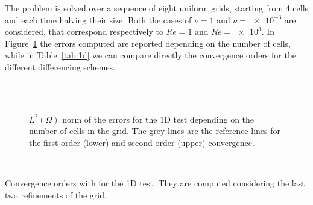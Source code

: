The problem is solved over a sequence of eight uniform grids, starting from 
4 cells and each time halving their size. Both the cases of $\nu=1$ 
and $\nu=\num{e-3}$ are considered, that correspond respectively to $Re=1$ and $Re=\num{e3}$. In Figure~\ref{fig:1d_err} the errors computed are reported 
depending on the number of cells, while in 
Table~\ref{tab:1d} we can compare directly the 
convergence orders for the different differencing schemes.
\begin{figure}
	\centering
	\subfloat[Upwind, $Re = 1$]{
		}
	\subfloat[Upwind, $Re = \num{e3}$]{
		}\\
	\subfloat[Min-Mod, $Re = 1$]{
		}
	\subfloat[Min-Mod, $Re = \num{e3}$]{
		}\\
	\subfloat[Van Leer, $Re = 1$]{
		}
	\subfloat[Van Leer, $Re = \num{e3}$]{
		}
	\caption[$L^2(\Omega)$ norm of the errors for the 1D test]{$L^2(\Omega)$ 
	norm of the errors for the 1D test 
	depending on the number of cells in the grid. The grey lines are the 
	reference lines for the first-order (lower) and second-order (upper) 
	convergence.}
	\label{fig:1d_err}
\end{figure}
\begin{table}
	\centering
	\\
	\caption[Convergence orders for the 1D 
	test]{Convergence orders with for the 1D test. They 
	are computed considering the last two refinements of the grid.}
	\label{tab:1d}
\end{table}

